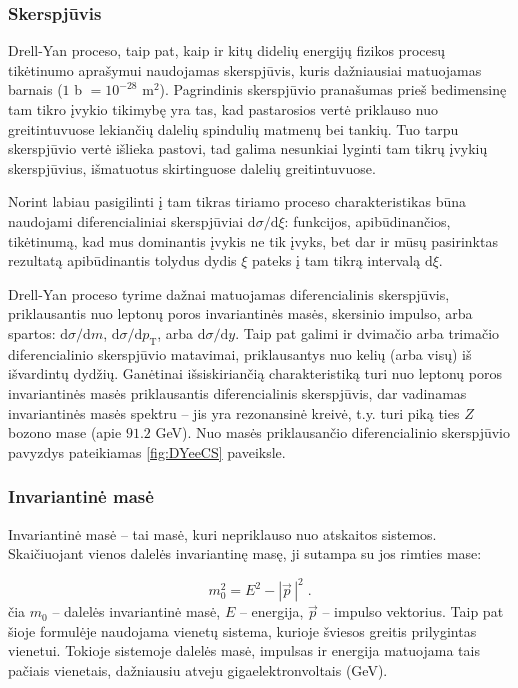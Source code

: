 \documentclass[a4paper, 12pt]{article}
\newlength\q
\begin{document}
\subsubsection{Skerspjūvis}

Drell-Yan proceso, taip pat, kaip ir kitų didelių energijų fizikos procesų tikėtinumo aprašymui
naudojamas skerspjūvis, kuris dažniausiai matuojamas barnais ($1$ b $= 10^{-28}$ m$^{2}$).
Pagrindinis skerspjūvio pranašumas prieš bedimensinę tam tikro įvykio tikimybę yra tas, kad
pastarosios vertė priklauso nuo greitintuvuose lekiančių dalelių spindulių matmenų bei tankių.
Tuo tarpu skerspjūvio vertė išlieka pastovi, tad galima nesunkiai lyginti tam tikrų įvykių
skerspjūvius, išmatuotus skirtinguose dalelių greitintuvuose.

Norint labiau pasigilinti į tam tikras tiriamo proceso charakteristikas būna naudojami diferencialiniai
skerspjūviai $\mathrm{d}\sigma/\mathrm{d}\xi$: funkcijos, apibūdinančios, tikėtinumą, kad mus
dominantis įvykis ne tik įvyks, bet dar ir mūsų pasirinktas rezultatą apibūdinantis tolydus
dydis $\xi$ pateks į tam tikrą intervalą $\mathrm{d}\xi$.

Drell-Yan proceso tyrime dažnai matuojamas diferencialinis skerspjūvis, priklausantis nuo
leptonų poros invariantinės masės, skersinio impulso, arba spartos:
$\mathrm{d}\sigma / \mathrm{d}m$, $\mathrm{d}\sigma / \mathrm{d}p_{\mathrm{T}}$, arba
$\mathrm{d}\sigma / \mathrm{d}y$.
Taip pat galimi ir dvimačio arba trimačio diferencialinio skerspjūvio matavimai,
priklausantys nuo kelių (arba visų) iš išvardintų dydžių.
Ganėtinai išsiskiriančią charakteristiką turi nuo leptonų poros invariantinės masės priklausantis
diferencialinis skerspjūvis, dar vadinamas invariantinės masės spektru -- jis yra rezonansinė
kreivė, t.y. turi piką ties $Z$ bozono mase (apie $91.2$ GeV).
Nuo masės priklausančio diferencialinio skerspjūvio pavyzdys pateikiamas \ref{fig:DYeeCS} paveiksle.


\subsubsection*{Invariantinė masė} 

Invariantinė masė -- tai masė, kuri nepriklauso nuo atskaitos sistemos.
Skaičiuojant vienos dalelės invariantinę masę, ji sutampa su jos rimties mase:

\begin{equation}
	m_{0}^{2} = E^{2} - | \vec{p}\, |^{2} \; .
	\label{eq:invm}
\end{equation}
čia $m_{0}$ -- dalelės invariantinė masė, $E$ -- energija, $\vec{p}$ -- impulso vektorius.
Taip pat šioje formulėje naudojama vienetų sistema, kurioje šviesos greitis prilygintas vienetui.
Tokioje sistemoje dalelės masė, impulsas ir energija matuojama tais pačiais vienetais, dažniausiu atveju
gigaelektronvoltais (GeV).
\end{document}
